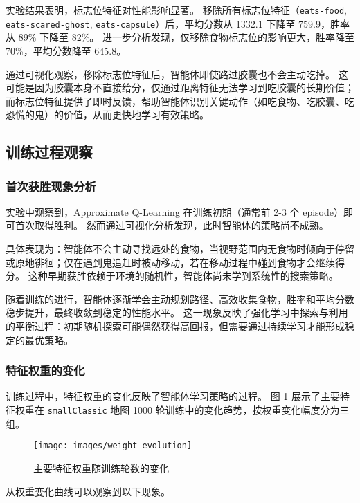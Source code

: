 实验结果表明，标志位特征对性能影响显著。
移除所有标志位特征（\texttt{eats-food}, \texttt{eats-scared-ghost}, \texttt{eats-capsule}）后，平均分数从 1332.1 下降至 759.9，胜率从 89\% 下降至 82\%。
进一步分析发现，仅移除食物标志位的影响更大，胜率降至 70\%，平均分数降至 645.8。

通过可视化观察，移除标志位特征后，智能体即使路过胶囊也不会主动吃掉。
这可能是因为胶囊本身不直接给分，仅通过距离特征无法学习到吃胶囊的长期价值；
而标志位特征提供了即时反馈，帮助智能体识别关键动作（如吃食物、吃胶囊、吃恐慌的鬼）的价值，从而更快地学习有效策略。

\subsection{训练过程观察}

\subsubsection{首次获胜现象分析}

实验中观察到，Approximate Q-Learning 在训练初期（通常前 2-3 个 episode）即可首次取得胜利。
然而通过可视化分析发现，此时智能体的策略尚不成熟。

具体表现为：智能体不会主动寻找远处的食物，当视野范围内无食物时倾向于停留或原地徘徊；仅在遇到鬼追赶时被动移动，若在移动过程中碰到食物才会继续得分。
这种早期获胜依赖于环境的随机性，智能体尚未学到系统性的搜索策略。

随着训练的进行，智能体逐渐学会主动规划路径、高效收集食物，胜率和平均分数稳步提升，最终收敛到稳定的性能水平。
这一现象反映了强化学习中探索与利用的平衡过程：初期随机探索可能偶然获得高回报，但需要通过持续学习才能形成稳定的最优策略。

\subsubsection{特征权重的变化}

训练过程中，特征权重的变化反映了智能体学习策略的过程。
图 \ref{fig:weight_evolution} 展示了主要特征权重在 \texttt{smallClassic} 地图 1000 轮训练中的变化趋势，按权重变化幅度分为三组。

\begin{figure}[htbp]
    \centering
    \texttt{[image: images/weight\_evolution]}
    \caption{主要特征权重随训练轮数的变化}
    \label{fig:weight_evolution}
\end{figure}

从权重变化曲线可以观察到以下现象。

